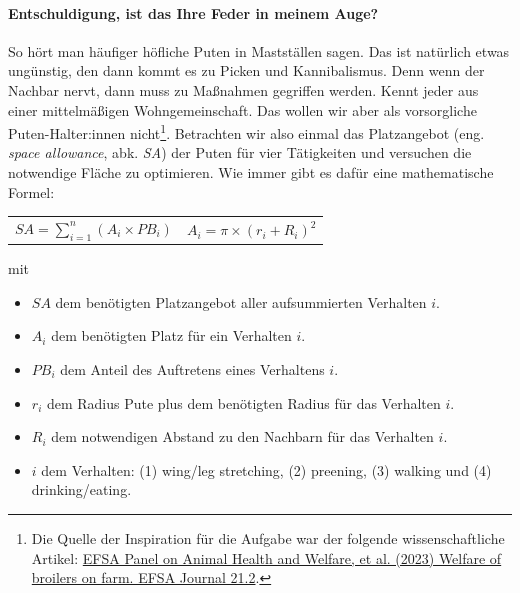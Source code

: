 \documentclass[a4paper, 9pt]{scrartcl}\usepackage[]{graphicx}\usepackage[]{xcolor}
\begin{document}
\paragraph{Entschuldigung, ist das Ihre Feder in meinem Auge?}



So h{\"o}rt man h{\"a}ufiger h{\"o}fliche Puten in Mastst{\"a}llen sagen. Das
ist nat{\"u}rlich etwas ung{\"u}nstig, den dann kommt es zu Picken und
Kannibalismus. Denn wenn der Nachbar nervt, dann muss zu Ma{\ss}nahmen
gegriffen werden. Kennt jeder aus einer mittelm{\"a}{\ss}igen Wohngemeinschaft. Das
wollen wir aber als vorsorgliche Puten-Halter:innen
nicht\footnote{Die Quelle der Inspiration f{\"u}r die Aufgabe war der folgende
  wissenschaftliche Artikel:
  \href{https://www.efsa.europa.eu/en/efsajournal/pub/7788}{EFSA Panel on
    Animal Health and Welfare, et al. (2023) Welfare of broilers on
    farm. EFSA Journal 21.2}.}. Betrachten wir also einmal das Platzangebot
(eng. \textit{space allowance}, abk. \textit{SA}) der Puten
f{\"u}r vier T{\"a}tigkeiten und versuchen die notwendige Fl{\"a}che zu optimieren. Wie
immer gibt es daf{\"u}r eine mathematische Formel:


\begin{center}
  \begin{tabular}{cc}
    $SA = \sum^n_{i = 1} (A_i \times PB_i)$ & $A_i = \pi \times (r_i + R_i)^2$\\
  \end{tabular}
\end{center}

\vspace{-2Ex}

mit

\begin{itemize}[noitemsep]
\item $SA$ dem ben{\"o}tigten Platzangebot aller aufsummierten Verhalten $i$.
\item $A_i$ dem ben{\"o}tigten Platz f{\"u}r ein Verhalten $i$. 
\item $PB_i$ dem Anteil des Auftretens eines Verhaltens $i$.
\item $r_i$ dem Radius Pute plus dem ben{\"o}tigten Radius f{\"u}r das Verhalten $i$.
\item $R_i$ dem notwendigen Abstand zu den Nachbarn f{\"u}r das Verhalten $i$.    
\item $i$ dem Verhalten: (1) wing/leg stretching, (2) preening, (3)
  walking und (4) drinking/eating.
\end{itemize}
\end{document}
